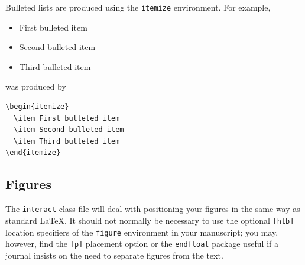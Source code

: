 \documentclass[]{interact}
\theoremstyle{plain}%
\theoremstyle{definition}
\theoremstyle{remark}
\begin{document}
Bulleted lists are produced using the \texttt{itemize} environment. For example,
\begin{itemize}
  \item First bulleted item
  \item Second bulleted item
  \item Third bulleted item
\end{itemize}
was produced by
\begin{verbatim}
\begin{itemize}
  \item First bulleted item
  \item Second bulleted item
  \item Third bulleted item
\end{itemize}
\end{verbatim}


\subsection{Figures}

The \texttt{interact} class file will deal with positioning your figures in the same way as standard \LaTeX. It should not normally be necessary to use the optional \texttt{[htb]} location specifiers of the \texttt{figure} environment in your manuscript; you may, however, find the \verb"[p]" placement option or the \verb"endfloat" package useful if a journal insists on the need to separate figures from the text.
\end{document}

